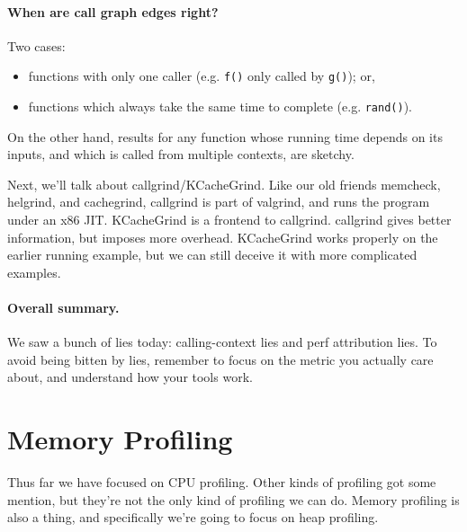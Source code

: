 \paragraph{When are call graph edges right?}
Two cases:
\vspace*{-1em}
    \begin{itemize}[noitemsep]
    \item functions with only one caller
      (e.g. {\tt f()} only called by {\tt g()}); or,
    \item functions which always take the same time to complete
      (e.g. {\tt rand()}).
    \end{itemize}
\vspace*{-1em}

On the other hand, results for any function whose running time depends on its inputs,
and which is called from multiple contexts, are sketchy.


Next, we'll talk about callgrind/KCacheGrind. Like our old friends memcheck, helgrind, and cachegrind, callgrind is part of valgrind, and runs the program under an x86 JIT.  KCacheGrind is a frontend to callgrind. callgrind gives better information, but imposes
more overhead.
KCacheGrind works properly on the earlier running example, but we can still deceive it with more complicated examples.




\paragraph{Overall summary.} We saw a bunch of lies today: calling-context lies and perf attribution
lies. To avoid being bitten by lies, remember to focus on the metric you actually care about,
and understand how your tools work.

\section*{Memory Profiling}

Thus far we have focused on CPU profiling. Other kinds of profiling got some mention, but they're not the only kind of profiling we can do. Memory profiling is also a thing, and specifically we're going to focus on heap profiling.


